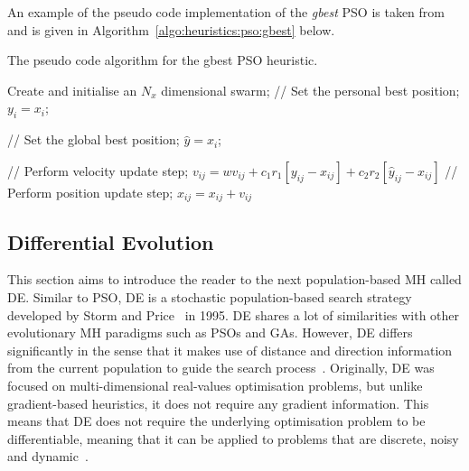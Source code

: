 An example of the pseudo code implementation of the \textit{gbest} \acs{PSO} is taken from~\cite{ref:engelbrecht:2007} and is given in Algorithm~\ref{algo:heuristics:pso:gbest} below.

\begin{algorithm}[H]
      \caption{The pseudo code algorithm for the gbest \acs{PSO} heuristic.}
      \label{algo:heuristics:pso:gbest}
      \begin{algorithmic}
            \State Create and initialise an $N_{x}$ dimensional swarm;
            \State // Set the personal best position;
            \State $y_{i} = x_{i}$;
            \EndIf

            \State // Set the global best position;
            \State $\hat{y} = x_{i}$;
            \EndIf
            \EndFor

            \State // Perform velocity update step;
            \State $v_{ij} = wv_{ij} + c_{1}r_{1}[y_{ij} - x_{ij}] + c_{2}r_{2}[\hat{y}_{ij} - x_{ij}]$
            \State // Perform position update step;
            \State $x_{ij} = x_{ij} + v_{ij}$
            \EndFor
            \EndWhile
      \end{algorithmic}
\end{algorithm}

\subsection{Differential Evolution}
\label{sec:heuristics:mh:de}

This section aims to introduce the reader to the next population-based \acs{MH} called \acl{DE}. Similar to \acs{PSO}, \Ac{DE} is a stochastic population-based search strategy developed by Storm and Price~\cite{ref:price:2006} in 1995. \Ac{DE} shares a lot of similarities with other evolutionary \acs{MH} paradigms such as \acp{PSO} and \acp{GA}. However, \acs{DE} differs significantly in the sense that it makes use of distance and direction information from the current population to guide the search process~\cite{ref:engelbrecht:2007}. Originally, \acs{DE} was focused on multi-dimensional real-values optimisation problems, but unlike gradient-based heuristics, it does not require any gradient information. This means that \acs{DE} does not require the underlying optimisation problem to be differentiable, meaning that it can be applied to problems that are discrete, noisy and dynamic~\cite{ref:rocca:2011}.

